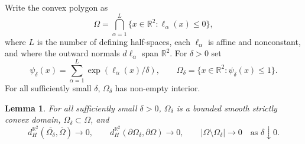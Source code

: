 \documentclass[11pt]{amsart}
\newtheorem{lemma}[theorem]{Lemma}
\numberwithin{equation}{section}
\newcommand{\R}{\mathbb R}
\newcommand{\Om}{\Omega}
\begin{document}
Write the convex polygon as
\begin{equation}\label{eq:polygon-halfspace}
\Om=\bigcap_{\alpha=1}^{L}\{x\in\R^2:\ell_\alpha(x)\le0\},
\end{equation}
where $L$ is the number of defining half-spaces, each $\ell_\alpha$ is affine
and nonconstant, and where the outward normals $d\ell_\alpha$ span $\R^2$.  For
$\delta>0$ set
\begin{equation}\label{eq:psi-delta-and-omega-delta}
\psi_\delta(x)=\sum_{\alpha=1}^{L} \exp(\ell_\alpha(x)/\delta),
\qquad
\Om_\delta=\{x\in\R^2:\psi_\delta(x)\le1\}.
\end{equation}
For all sufficiently small $\delta$, $\Om_\delta$ has non-empty interior.

\begin{lemma}\label{lem:Omega-delta}
For all sufficiently small $\delta>0$, $\Om_\delta$ is a bounded smooth strictly
convex domain, $\Om_\delta\subset\Om$, and
\begin{equation}\label{eq:omega-delta-convergence}
d_H^{\R^2}(\overline{\Om_\delta},\overline\Om)\to0,
\qquad
d_H^{\R^2}(\partial\Om_\delta,\partial\Om)\to0,
\qquad
|\Om\setminus\Om_\delta|\to0
\quad\text{as }\delta\downarrow0.
\end{equation}
\end{lemma}
\end{document}
